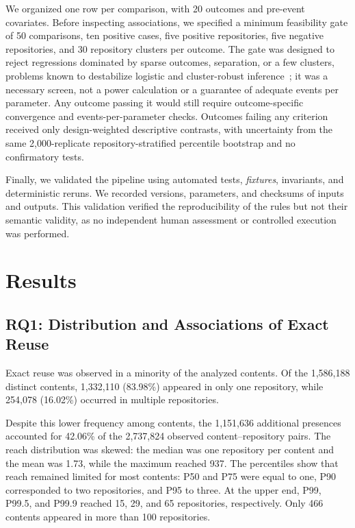 \documentclass[conference]{IEEEtran}
\begin{document}
We organized one row per comparison, with 20 outcomes and pre-event covariates. Before inspecting associations, we specified a minimum feasibility gate of 50 comparisons, ten positive cases, five positive repositories, five negative repositories, and 30 repository clusters per outcome. The gate was designed to reject regressions dominated by sparse outcomes, separation, or a few clusters, problems known to destabilize logistic and cluster-robust inference~\cite{peduzzi1996,cameron2015}; it was a necessary screen, not a power calculation or a guarantee of adequate events per parameter. Any outcome passing it would still require outcome-specific convergence and events-per-parameter checks. Outcomes failing any criterion received only design-weighted descriptive contrasts, with uncertainty from the same 2,000-replicate repository-stratified percentile bootstrap and no confirmatory tests.

Finally, we validated the pipeline using automated tests, \textit{fixtures}, invariants, and deterministic reruns. We recorded versions, parameters, and checksums of inputs and outputs. This validation verified the reproducibility of the rules but not their semantic validity, as no independent human assessment or controlled execution was performed.


\section{Results}
\subsection{RQ1: Distribution and Associations of Exact Reuse}
Exact reuse was observed in a minority of the analyzed contents. Of the 1,586,188 distinct contents, 1,332,110 (83.98\%) appeared in only one repository, while 254,078 (16.02\%) occurred in multiple repositories.

Despite this lower frequency among contents, the 1,151,636 additional presences accounted for 42.06\% of the 2,737,824 observed content--repository pairs. The reach distribution was skewed: the median was one repository per content and the mean was 1.73, while the maximum reached 937. The percentiles show that reach remained limited for most contents: P50 and P75 were equal to one, P90 corresponded to two repositories, and P95 to three. At the upper end, P99, P99.5, and P99.9 reached 15, 29, and 65 repositories, respectively. Only 466 contents appeared in more than 100 repositories.
\end{document}
